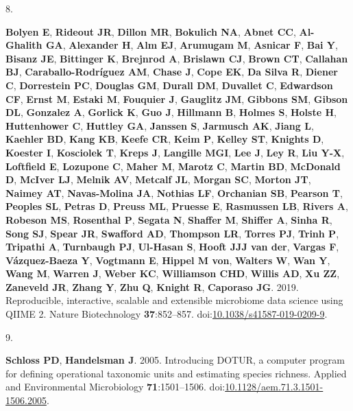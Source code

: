 \documentclass[
  11pt,
]{article}
\newlength{\cslhangindent}
\newlength{\csllabelwidth}
\newenvironment{CSLReferences}[2] %
 {\begin{list}{}{%
  \setlength{\itemindent}{0pt}
  \setlength{\leftmargin}{0pt}
  \setlength{\parsep}{0pt}
  \ifodd #1
   \setlength{\leftmargin}{\cslhangindent}
   \setlength{\itemindent}{-1\cslhangindent}
  \fi
  \setlength{\itemsep}{#2\baselineskip}}}
 {\end{list}}
\newcommand{\CSLLeftMargin}[1]{\parbox[t]{\csllabelwidth}{\strut#1\strut}}
\newcommand{\CSLRightInline}[1]{\parbox[t]{\linewidth - \csllabelwidth}{\strut#1\strut}}
\begin{document}
\begin{CSLReferences}{0}{1}
\CSLLeftMargin{8. }%
\CSLRightInline{\textbf{Bolyen E}, \textbf{Rideout JR}, \textbf{Dillon
MR}, \textbf{Bokulich NA}, \textbf{Abnet CC}, \textbf{Al-Ghalith GA},
\textbf{Alexander H}, \textbf{Alm EJ}, \textbf{Arumugam M},
\textbf{Asnicar F}, \textbf{Bai Y}, \textbf{Bisanz JE},
\textbf{Bittinger K}, \textbf{Brejnrod A}, \textbf{Brislawn CJ},
\textbf{Brown CT}, \textbf{Callahan BJ}, \textbf{Caraballo-Rodríguez
AM}, \textbf{Chase J}, \textbf{Cope EK}, \textbf{Da Silva R},
\textbf{Diener C}, \textbf{Dorrestein PC}, \textbf{Douglas GM},
\textbf{Durall DM}, \textbf{Duvallet C}, \textbf{Edwardson CF},
\textbf{Ernst M}, \textbf{Estaki M}, \textbf{Fouquier J},
\textbf{Gauglitz JM}, \textbf{Gibbons SM}, \textbf{Gibson DL},
\textbf{Gonzalez A}, \textbf{Gorlick K}, \textbf{Guo J},
\textbf{Hillmann B}, \textbf{Holmes S}, \textbf{Holste H},
\textbf{Huttenhower C}, \textbf{Huttley GA}, \textbf{Janssen S},
\textbf{Jarmusch AK}, \textbf{Jiang L}, \textbf{Kaehler BD},
\textbf{Kang KB}, \textbf{Keefe CR}, \textbf{Keim P}, \textbf{Kelley
ST}, \textbf{Knights D}, \textbf{Koester I}, \textbf{Kosciolek T},
\textbf{Kreps J}, \textbf{Langille MGI}, \textbf{Lee J}, \textbf{Ley R},
\textbf{Liu Y-X}, \textbf{Loftfield E}, \textbf{Lozupone C},
\textbf{Maher M}, \textbf{Marotz C}, \textbf{Martin BD},
\textbf{McDonald D}, \textbf{McIver LJ}, \textbf{Melnik AV},
\textbf{Metcalf JL}, \textbf{Morgan SC}, \textbf{Morton JT},
\textbf{Naimey AT}, \textbf{Navas-Molina JA}, \textbf{Nothias LF},
\textbf{Orchanian SB}, \textbf{Pearson T}, \textbf{Peoples SL},
\textbf{Petras D}, \textbf{Preuss ML}, \textbf{Pruesse E},
\textbf{Rasmussen LB}, \textbf{Rivers A}, \textbf{Robeson MS},
\textbf{Rosenthal P}, \textbf{Segata N}, \textbf{Shaffer M},
\textbf{Shiffer A}, \textbf{Sinha R}, \textbf{Song SJ}, \textbf{Spear
JR}, \textbf{Swafford AD}, \textbf{Thompson LR}, \textbf{Torres PJ},
\textbf{Trinh P}, \textbf{Tripathi A}, \textbf{Turnbaugh PJ},
\textbf{Ul-Hasan S}, \textbf{Hooft JJJ van der}, \textbf{Vargas F},
\textbf{Vázquez-Baeza Y}, \textbf{Vogtmann E}, \textbf{Hippel M von},
\textbf{Walters W}, \textbf{Wan Y}, \textbf{Wang M}, \textbf{Warren J},
\textbf{Weber KC}, \textbf{Williamson CHD}, \textbf{Willis AD},
\textbf{Xu ZZ}, \textbf{Zaneveld JR}, \textbf{Zhang Y}, \textbf{Zhu Q},
\textbf{Knight R}, \textbf{Caporaso JG}. 2019. Reproducible,
interactive, scalable and extensible microbiome data science using QIIME
2. Nature Biotechnology \textbf{37}:852--857.
doi:\href{https://doi.org/10.1038/s41587-019-0209-9}{10.1038/s41587-019-0209-9}.}

\CSLLeftMargin{9. }%
\CSLRightInline{\textbf{Schloss PD}, \textbf{Handelsman J}. 2005.
Introducing DOTUR, a computer program for defining operational taxonomic
units and estimating species richness. Applied and Environmental
Microbiology \textbf{71}:1501--1506.
doi:\href{https://doi.org/10.1128/aem.71.3.1501-1506.2005}{10.1128/aem.71.3.1501-1506.2005}.}

\end{CSLReferences}
\end{document}
